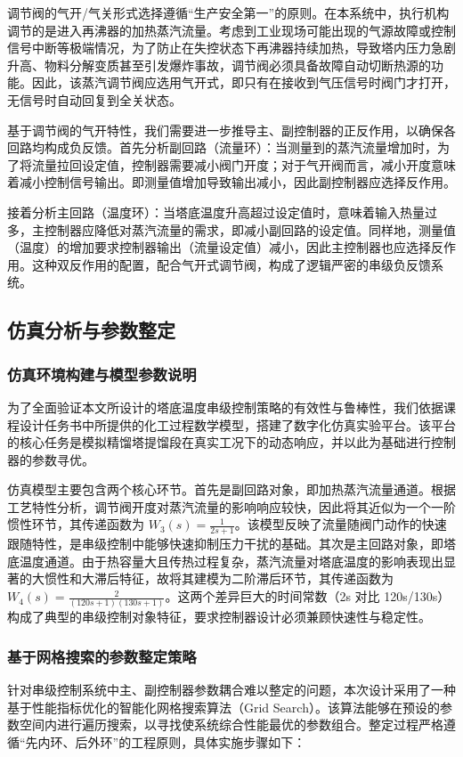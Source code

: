 \documentclass[a4paper,zihao=-4]{article}
\numberwithin{equation}{section}
\numberwithin{figure}{section}
\numberwithin{table}{section}
\begin{document}
调节阀的气开/气关形式选择遵循“生产安全第一”的原则。在本系统中，执行机构调节的是进入再沸器的加热蒸汽流量。考虑到工业现场可能出现的气源故障或控制信号中断等极端情况，为了防止在失控状态下再沸器持续加热，导致塔内压力急剧升高、物料分解变质甚至引发爆炸事故，调节阀必须具备故障自动切断热源的功能。因此，该蒸汽调节阀应选用气开式，即只有在接收到气压信号时阀门才打开，无信号时自动回复到全关状态。

基于调节阀的气开特性，我们需要进一步推导主、副控制器的正反作用，以确保各回路均构成负反馈。首先分析副回路（流量环）：当测量到的蒸汽流量增加时，为了将流量拉回设定值，控制器需要减小阀门开度；对于气开阀而言，减小开度意味着减小控制信号输出。即测量值增加导致输出减小，因此副控制器应选择反作用。

接着分析主回路（温度环）：当塔底温度升高超过设定值时，意味着输入热量过多，主控制器应降低对蒸汽流量的需求，即减小副回路的设定值。同样地，测量值（温度）的增加要求控制器输出（流量设定值）减小，因此主控制器也应选择反作用。这种双反作用的配置，配合气开式调节阀，构成了逻辑严密的串级负反馈系统。

\subsection{仿真分析与参数整定}

\subsubsection{仿真环境构建与模型参数说明}
为了全面验证本文所设计的塔底温度串级控制策略的有效性与鲁棒性，我们依据课程设计任务书中所提供的化工过程数学模型，搭建了数字化仿真实验平台。该平台的核心任务是模拟精馏塔提馏段在真实工况下的动态响应，并以此为基础进行控制器的参数寻优。

仿真模型主要包含两个核心环节。首先是副回路对象，即加热蒸汽流量通道。根据工艺特性分析，调节阀开度对蒸汽流量的影响响应较快，因此将其近似为一个一阶惯性环节，其传递函数为 $W_3(s) = \frac{1}{2s+1}$。该模型反映了流量随阀门动作的快速跟随特性，是串级控制中能够快速抑制压力干扰的基础。其次是主回路对象，即塔底温度通道。由于热容量大且传热过程复杂，蒸汽流量对塔底温度的影响表现出显著的大惯性和大滞后特征，故将其建模为二阶滞后环节，其传递函数为 $W_4(s) = \frac{2}{(120s+1)(130s+1)}$。这两个差异巨大的时间常数（2s 对比 120s/130s）构成了典型的串级控制对象特征，要求控制器设计必须兼顾快速性与稳定性。

\subsubsection{基于网格搜索的参数整定策略}
针对串级控制系统中主、副控制器参数耦合难以整定的问题，本次设计采用了一种基于性能指标优化的智能化网格搜索算法（Grid Search）。该算法能够在预设的参数空间内进行遍历搜索，以寻找使系统综合性能最优的参数组合。整定过程严格遵循“先内环、后外环”的工程原则，具体实施步骤如下：
\end{document}
